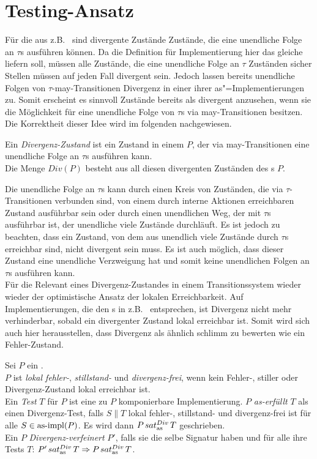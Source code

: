 \section{Testing-Ansatz}

Für die \EIO{} aus z.B.~\cite{Schinko2016BA} sind divergente Zustände Zustände,
die eine unendliche Folge an $\tau$s ausführen können. Da die Definition für
Implementierung hier das gleiche liefern soll, müssen alle Zustände, die eine
unendliche Folge an $\tau$ Zuständen sicher Stellen müssen auf jeden Fall
divergent sein. Jedoch lassen bereits unendliche Folgen von
$\tau$-may-Transitionen Divergenz in einer ihrer as"=Implementierungen zu.
Somit erscheint es sinnvoll Zustände bereits als divergent anzusehen, wenn sie
die Möglichkeit für eine unendliche Folge von $\tau$s via may-Transitionen
besitzen. Die Korrektheit dieser Idee wird im folgenden nachgewiesen.

\begin{Def}[Divergenz]
  Ein \emph{Divergenz-Zustand} ist ein Zustand in einem \MEIO{} $P$, der via
  may-Transitionen eine unendliche Folge an $\tau$s ausführen kann.\\
  Die Menge $Div(P)$ besteht aus all diesen divergenten Zuständen des \MEIO{}s
  $P$.
\end{Def}

Die unendliche Folge an $\tau$s kann durch einen Kreis von Zuständen, die via
$\tau$-Transitionen verbunden sind, von einem durch interne Aktionen
erreichbaren Zustand ausführbar sein oder durch einen unendlichen Weg, der mit
$\tau$s ausführbar ist, der unendliche viele Zustände durchläuft. Es ist jedoch
zu beachten, dass ein Zustand, von dem aus unendlich viele Zustände durch
$\tau$s  erreichbar sind, nicht divergent sein muss. Es ist auch möglich,
dass dieser Zustand eine unendliche Verzweigung hat und somit keine unendlichen
Folgen an $\tau$s ausführen kann.\\
Für die Relevant eines Divergenz-Zustandes in einem Transitionssystem wieder
wieder der optimistische Ansatz der lokalen Erreichbarkeit. Auf
Implementierungen, die den \EIO{}s in z.B.~\cite{Schinko2016BA} entsprechen,
ist Divergenz nicht mehr verhinderbar, sobald ein divergenter Zustand lokal
erreichbar ist. Somit wird sich auch hier herausstellen, dass Divergenz als
ähnlich \glqq schlimm\grqq{} zu bewerten wie ein Fehler-Zustand.

\begin{Def}
  \label{DivTestDef}
  Sei $P$ ein \MEIO{}.\\
  $P$ ist \emph{lokal fehler-}, \emph{stillstand-} und \emph{divergenz-frei},
  wenn kein Fehler-, stiller oder Divergenz-Zustand lokal erreichbar ist.\\
  Ein \emph{Test} $T$ für $P$ ist eine zu $P$ komponierbare Implementierung.
  $P$ \emph{as-erfüllt} $T$ als einen Divergenz-Test, falls $S\|T$ lokal
  fehler-, stillstand- und divergenz-frei ist für alle $S\in \mathrm{as}\text{-}\mathrm{impl} (P)$. Es
  wird dann $P\hspace{0.05cm}sat_\mathrm{as}^{Div}\hspace{0.05cm} T$ geschrieben.\\
  Ein \MEIO{} $P$ \emph{Divergenz-verfeinert} $P'$, falls sie die selbe
  Signatur haben und für alle ihre Tests $T$: $P'\hspace{0.05cm}sat_\mathrm{as}^{Div}\hspace{0.05cm} T \Rightarrow P\hspace{0.05cm}sat_\mathrm{as}^{Div}\hspace{0.05cm}
  T$.
\end{Def}

